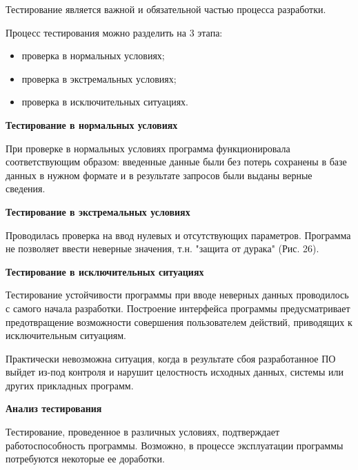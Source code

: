 Тестирование является важной и обязательной частью процесса разработки.

Процесс тестирования можно разделить на 3 этапа:
\begin{itemize}
  \item проверка в нормальных условиях;
  \item проверка в экстремальных условиях;
  \item проверка в исключительных ситуациях.
\end{itemize}

\textbf{Тестирование в нормальных условиях}

При проверке в нормальных условиях программа функционировала соответствующим образом:
введенные данные были без потерь сохранены в базе данных в нужном формате и в результате запросов были выданы верные сведения.

\textbf{Тестирование в экстремальных условиях}

Проводилась проверка на ввод нулевых и отсутствующих параметров. Программа не позволяет ввести неверные значения, т.н.
"защита от дурака" (Рис. 26).


\textbf{Тестирование в исключительных ситуациях}

Тестирование устойчивости программы при вводе неверных данных проводилось с самого начала разработки.
Построение интерфейса программы предусматривает предотвращение возможности совершения пользователем действий,
приводящих к исключительным ситуациям.

Практически невозможна ситуация, когда в результате сбоя разработанное ПО выйдет из-под контроля и
нарушит целостность исходных данных, системы или других прикладных программ.

\textbf{Анализ тестирования}

Тестирование, проведенное в различных условиях, подтверждает работоспособность программы. Возможно, в процессе эксплуатации программы потребуются некоторые ее доработки.
